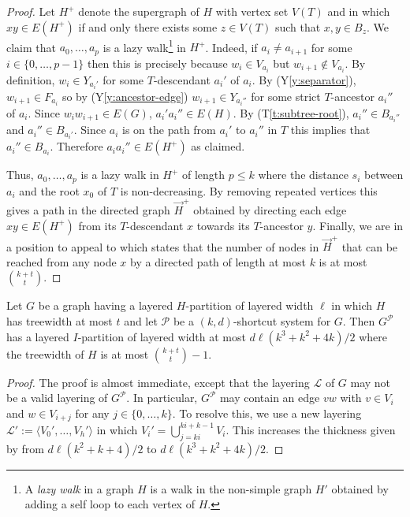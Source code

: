 \documentclass{patmorin}
\newcommand{\tref}[1]{(T\ref{t:#1})}
\newcommand{\yref}[1]{(Y\ref{y:#1})}
\begin{document}
\begin{proof}
  Let $H^+$ denote the supergraph of $H$ with vertex set $V(T)$ and in which $xy\in E(H^+)$ if and only there exists some $z\in V(T)$ such that $x,y\in B_z$. 
  We claim that $a_0,\ldots,a_p$ is a lazy walk\footnote{A \emph{lazy walk} in a graph $H$ is a walk in the non-simple graph $H'$ obtained by adding a self loop to each vertex of $H$.} in $H^+$.  Indeed, if $a_i\neq a_{i+1}$ for some $i\in\{0,\ldots,p-1\}$ then this is precisely because $w_i\in V_{a_i}$ but $w_{i+1}\not\in V_{a_i}$.  By definition, $w_i\in Y_{a_i'}$ for some $T$-descendant $a_i'$ of $a_i$.
  By \yref{separator}, $w_{i+1}\in F_{a_i}$ so by \yref{ancestor-edge} $w_{i+1}\in Y_{a_i''}$ for some strict $T$-ancestor $a_i''$ of $a_i$.  Since $w_iw_{i+1}\in E(G)$, $a_i'a_i''\in E(H)$.  By \tref{subtree-root}, $a_i''\in B_{a_i''}$ and $a_i''\in B_{a_i'}$.  Since $a_i$ is on the path from $a_i'$ to $a_i''$ in $T$ this implies that $a_i''\in B_{a_i}$.  Therefore $a_ia_i''\in E(H^+)$ as claimed.
  
  Thus, $a_0,\ldots,a_p$ is a lazy walk in $H^+$ of length $p\le k$ where the distance $s_i$ between $a_i$ and the root $x_0$ of $T$ is non-decreasing.  By removing repeated vertices this gives a path in the directed graph $\overrightarrow{H}^+$ obtained by directing each edge $xy\in E(H^+)$ from its $T$-descendant $x$ towards its $T$-ancestor $y$. 
  Finally, we are in a position to appeal to \cite[Lemma~24]{pilipczuk.siebertz:polynomial-arxiv} which states that the number of nodes in $\overrightarrow{H}^+$ that can be reached from any node $x$ by a directed path of length at most $k$ is at most $\binom{k+t}{t}$.
\end{proof}


\begin{thm}
  Let $G$ be a graph having a layered $H$-partition of layered width $\ell$ in which $H$ has treewidth at most $t$ and let $\mathcal{P}$ be a $(k,d)$-shortcut system for $G$.  Then $G^{\mathcal{P}}$ has a layered $I$-partition of layered width at most $d\ell(k^3+k^2+4k)/2$ where the treewidth of $H$ is at most $\binom{k+t}{t}-1$.
\end{thm}

\begin{proof}
  The proof is almost immediate, except that the layering $\mathcal{L}$ of $G$ may not be a valid layering of $G^{\mathcal{P}}$.  In particular, $G^{\mathcal{P}}$ may contain an edge $vw$ with $v\in V_i$ and $w\in V_{i+j}$ for any $j\in\{0,\ldots,k\}$.  To resolve this, we use a new layering $\mathcal{L}':=\langle V_0',\ldots,V_h'\rangle$ in which $V_i'=\bigcup_{j=ki}^{ki+k-1} V_i$.  This increases the thickness given by  from $d\ell(k^2+k+4)/2$ to $d\ell(k^3+k^2+4k)/2$.
\end{proof}
\end{document}
